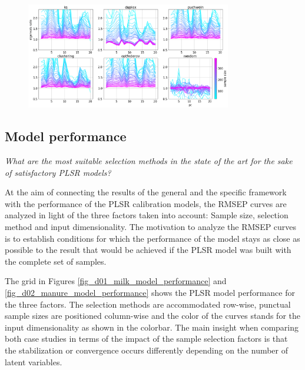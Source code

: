 \documentclass{article}
\begin{document}
\begin{figure}[b]
\includegraphics[width=0.8\textwidth]{manuscript/figures/d02_manure_specific_framework_eigenvalsratio.png}
\centering
\caption{}
\label{fig_d02_manure_specific_framework_eigenvalsratio}
\end{figure}

\subsection*{Model performance}\label{results:modperformance}


\emph{What are the most suitable selection methods in the state of the art for the sake of satisfactory PLSR models?}

At the aim of connecting the results of the general and the specific framework with the performance of the PLSR calibration models, the RMSEP curves are analyzed in light of the three factors taken into account: Sample size, selection method and input dimensionality. The motivation to analyze the RMSEP curves is to establish conditions for which the performance of the model stays as close as possible to the result that would be achieved if the PLSR model was built with the complete set of samples. 

The grid in Figures \ref{fig_d01_milk_model_performance} and \ref{fig_d02_manure_model_performance} shows the PLSR model performance for the three factors. The selection methods are accommodated row-wise, punctual sample sizes are positioned column-wise and the color of the curves stands for the input dimensionality as shown in the colorbar. The main insight when comparing both case studies in terms of the impact of the sample selection factors is that the stabilization or convergence occurs differently depending on the number of latent variables. 
\end{document}
